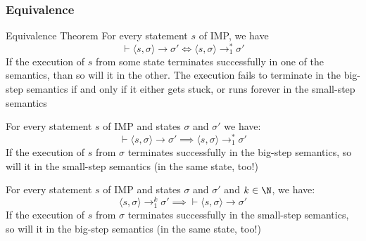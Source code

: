 \newpage
\subsubsection{Equivalence}
\begin{theorem}[]{Equivalence Theorem}
    For every statement $s$ of IMP, we have
    \[
        \vdash \langle s, \sigma \rangle \rightarrow \sigma' \Leftrightarrow \langle s, \sigma \rangle \rightarrow_1^* \sigma'
    \]
    {\scriptsize If the execution of $s$ from some state terminates successfully in one of the semantics, than so will it in the other.
    The execution fails to terminate in the big-step semantics if and only if it either gets stuck, or runs forever in the small-step semantics}
\end{theorem}


 For every statement $s$ of IMP and states $\sigma$ and $\sigma'$ we have:
\[
    \vdash \langle s, \sigma \rangle \rightarrow \sigma' \implies \langle s, \sigma \rangle \rightarrow_1^* \sigma'
\]
{\scriptsize If the execution of $s$ from $\sigma$ terminates successfully in the big-step semantics, so will it in the small-step semantics (in the same state, too!)}


 For every statement $s$ of IMP and states $\sigma$ and $\sigma'$ and $k \in \N$, we have:
\[
    \langle s, \sigma \rangle \rightarrow_1^k \sigma' \implies \vdash \langle s, \sigma \rangle \rightarrow \sigma'
\]
{\scriptsize If the execution of $s$ from $\sigma$ terminates successfully in the small-step semantics, so will it in the big-step semantics (in the same state, too!)}
